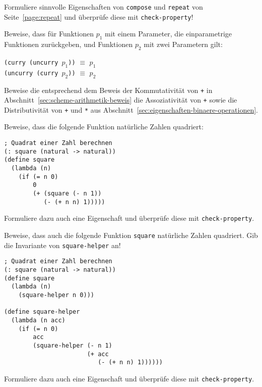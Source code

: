 \begin{aufgabe}
  Formuliere sinnvolle Eigenschaften von \lstinline{compose} und
  \lstinline{repeat} von Seite~\ref{page:repeat} und überprüfe
  diese mit \lstinline{check-property}!
\end{aufgabe}

\begin{aufgabe}
  Beweise, dass für Funktionen $p_1$ mit einem Parameter, die
  einparametrige Funktionen zurückgeben, und Funktionen $p_2$ mit zwei
  Parametern gilt:
  \begin{center}
    \texttt{(curry (uncurry $p_1$))} $\equiv$ $p_1$\\
    \texttt{(uncurry (curry $p_2$))} $\equiv$ $p_2$
  \end{center}
\end{aufgabe}

\begin{aufgabe}
  Beweise die entsprechend dem Beweis der Kommutativität von
  \lstinline{+} in Abschnitt~\ref{sec:scheme-arithmetik-beweis} die
  Assoziativität von \lstinline{+} sowie die Distributivität von
  \lstinline{+} und \lstinline{*} aus
  Abschnitt~\ref{sec:eigenschaften-binaere-operationen}.
\end{aufgabe}

\begin{aufgabe}
Beweise, dass die
folgende Funktion natürliche Zahlen quadriert:
%
\begin{lstlisting}
; Quadrat einer Zahl berechnen
(: square (natural -> natural))
(define square
  (lambda (n)
    (if (= n 0)
        0
        (+ (square (- n 1))
           (- (+ n n) 1)))))
\end{lstlisting}
%
Formuliere dazu auch eine Eigenschaft und überprüfe diese
mit \lstinline{check-property}.
%
\end{aufgabe}

\begin{aufgabe}
Beweise, dass auch die folgende Funktion \lstinline{square}
natürliche Zahlen quadriert.  Gib die Invariante von
\lstinline{square-helper} an!
%
\begin{lstlisting}
; Quadrat einer Zahl berechnen
(: square (natural -> natural))
(define square
  (lambda (n)
    (square-helper n 0)))

(define square-helper
  (lambda (n acc)
    (if (= n 0)
        acc
        (square-helper (- n 1)
                       (+ acc
                          (- (+ n n) 1))))))
\end{lstlisting}
Formuliere dazu auch eine Eigenschaft und überprüfe diese
mit \lstinline{check-property}.
\end{aufgabe}

